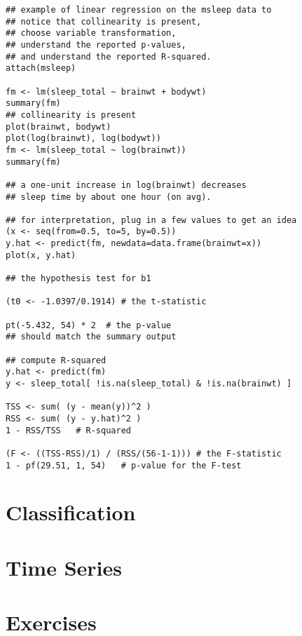 \begin{Verbatim}
## example of linear regression on the msleep data to
## notice that collinearity is present,
## choose variable transformation,
## understand the reported p-values,
## and understand the reported R-squared.
attach(msleep)

fm <- lm(sleep_total ~ brainwt + bodywt)
summary(fm)
## collinearity is present
plot(brainwt, bodywt)
plot(log(brainwt), log(bodywt))
fm <- lm(sleep_total ~ log(brainwt))
summary(fm)

## a one-unit increase in log(brainwt) decreases
## sleep time by about one hour (on avg).

## for interpretation, plug in a few values to get an idea
(x <- seq(from=0.5, to=5, by=0.5))
y.hat <- predict(fm, newdata=data.frame(brainwt=x))
plot(x, y.hat)

## the hypothesis test for b1

(t0 <- -1.0397/0.1914) # the t-statistic

pt(-5.432, 54) * 2  # the p-value
## should match the summary output

## compute R-squared
y.hat <- predict(fm)
y <- sleep_total[ !is.na(sleep_total) & !is.na(brainwt) ]

TSS <- sum( (y - mean(y))^2 )
RSS <- sum( (y - y.hat)^2 )
1 - RSS/TSS   # R-squared

(F <- ((TSS-RSS)/1) / (RSS/(56-1-1))) # the F-statistic
1 - pf(29.51, 1, 54)   # p-value for the F-test
\end{Verbatim}

\section{Classification}

\section{Time Series}

\section{Exercises}

